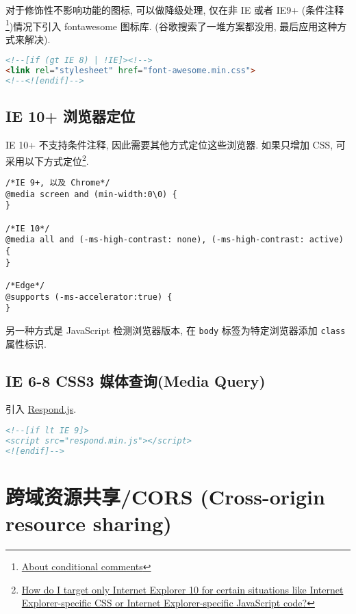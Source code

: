 对于修饰性不影响功能的图标, 可以做降级处理, 仅在非 IE 或者 IE9+
(条件注释\footnote{\href{https://msdn.microsoft.com/en-us/library/ms537512(v=vs.85).aspx}{About
  conditional comments}})情况下引入 fontawesome 图标库.
(谷歌搜索了一堆方案都没用, 最后应用这种方式来解决).

\begin{lstlisting}[language=HTML]
<!--[if (gt IE 8) | !IE]><!-->
<link rel="stylesheet" href="font-awesome.min.css">
<!--<![endif]-->
\end{lstlisting}

\subsection{IE 10+
浏览器定位}\label{ie-10-ux6d4fux89c8ux5668ux5b9aux4f4d}

IE 10+ 不支持条件注释, 因此需要其他方式定位这些浏览器. 如果只增加 CSS,
可采用以下方式定位\footnote{\href{http://stackoverflow.com/questions/9900311/how-do-i-target-only-internet-explorer-10-for-certain-situations-like-internet-e/14916454\#14916454}{How
  do I target only Internet Explorer 10 for certain situations like
  Internet Explorer-specific CSS or Internet Explorer-specific
  JavaScript code?}}.

\begin{lstlisting}
/*IE 9+, 以及 Chrome*/
@media screen and (min-width:0\0) {
}

/*IE 10*/
@media all and (-ms-high-contrast: none), (-ms-high-contrast: active) {
}

/*Edge*/
@supports (-ms-accelerator:true) {
}
\end{lstlisting}

另一种方式是 JavaScript 检测浏览器版本, 在 \lstinline!body!
标签为特定浏览器添加 \lstinline!class! 属性标识.

\subsection{IE 6-8 CSS3 媒体查询(Media
Query)}\label{ie-6-8-css3-ux5a92ux4f53ux67e5ux8be2media-query}

引入 \href{https://github.com/scottjehl/Respond}{Respond.js}.

\begin{lstlisting}[language=HTML]
<!--[if lt IE 9]>
<script src="respond.min.js"></script>
<![endif]-->
\end{lstlisting}

\section{跨域资源共享/CORS (Cross-origin resource
sharing)}\label{ux8de8ux57dfux8d44ux6e90ux5171ux4eabcors-cross-origin-resource-sharing}

